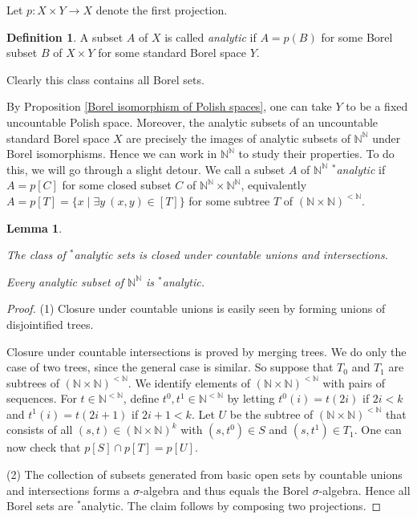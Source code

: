 \documentclass[10pt]{amsart}
\newcommand{\NN}{\mathbb{N}}
\newtheorem{lemma}[theorem]{Lemma}
\theoremstyle{definition}
\newtheorem{definition}[theorem]{Definition}
\theoremstyle{remark}
\newenvironment{enumerate-(1)}{\begin{enumerate}[label={\upshape (\arabic*)}, leftmargin=2pc]}{\end{enumerate}}
\begin{document}
Let $p\colon X\times Y\rightarrow X$ denote the first projection. 

\begin{definition} 
A subset $A$ of $X$ is called \emph{analytic} if $A=p(B)$ for some Borel subset $B$ of $X\times Y$ for some standard Borel space $Y$. 
\end{definition} 

Clearly this class contains all Borel sets. 

By Proposition \ref{Borel isomorphism of Polish spaces}, one can take $Y$ to be a fixed uncountable Polish space. 
Moreover, the analytic subsets of an uncountable standard Borel space $X$ are precisely the images of analytic subsets of $\NN^\NN$ under Borel isomorphisms. 
Hence we can work in $\NN^\NN$ to study their properties. 
To do this, we will go through a slight detour. 
We call a subset $A$ of $\NN^\NN$ \emph{${}^*$analytic} if $A=p[C]$ for some closed subset $C$ of $\NN^\NN\times \NN^\NN$, equivalently $A=p[T]=\{x\mid \exists y\ (x,y)\in [T]\}$ for some subtree $T$ of $(\NN\times\NN)^{<\NN}$. 

\begin{lemma} \label{characterization of analytic sets} 
\begin{enumerate-(1)} 
\item \label{characterization of analytic sets - closure} 
The class of ${}^*$analytic sets is closed under countable unions and intersections. 
\item 
Every analytic subset of $\NN^\NN$ is ${}^*$analytic. 
\end{enumerate-(1)} 
\end{lemma} 
\begin{proof} 
(1) 
Closure under countable unions is easily seen by forming unions of disjointified trees. 

Closure under countable intersections is proved by merging trees. 
We do only the case of two trees, since the general case is similar. 
So suppose that $T_0$ and $T_1$ are subtrees of $(\NN\times \NN)^{{<}\NN}$. 
We identify elements of $(\NN\times \NN)^{{<}\NN}$ with pairs of sequences. 
For $t\in \NN^{{<\NN}}$, define $t^0, t^1\in \NN^{{<}\NN}$ by letting $t^0(i)=t(2i)$ if $2i<k$ and $t^1(i)=t(2i+1)$ if $2i+1<k$. 
Let $U$ be the subtree of $(\NN\times \NN)^{{<}\NN}$ that consists of all $(s,t)\in (\NN\times \NN)^k$ with $(s,t^0)\in S$ and $(s,t^1)\in T_1$. 
One can now check that $p[S]\cap p[T]=p[U]$. 

(2) 
The collection of subsets generated from basic open sets by countable unions and intersections forms a $\sigma$-algebra and thus equals the Borel $\sigma$-algebra. 
Hence all Borel sets are ${}^*$analytic. 
The claim follows by composing two projections. 
\end{proof} 
\end{document}

